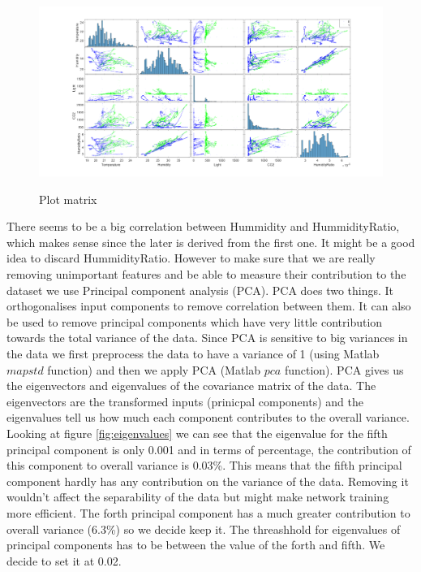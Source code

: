 \documentclass[a4paper, 11pt]{article}
\begin{document}
\begin{figure}[h]
  \caption{Plot matrix}
  \centering
    \includegraphics[width=1\textwidth]{Plotmatrix.png}
    \label{fig:plotmatrix}
\end{figure}

There seems to be a big correlation between Hummidity and HummidityRatio, which makes sense since the later is derived from the first one. It might be a good idea to discard HummidityRatio. However to make sure that we are really removing unimportant features and be able to measure their contribution to the dataset we use Principal component analysis (PCA). PCA does two things. It orthogonalises input components to remove correlation between them. It can also be used to remove principal components which have very little contribution towards the total variance of the data. Since PCA is sensitive to big variances in the data we first preprocess the data to have a variance of 1 (using Matlab $mapstd$ function) and then we apply PCA (Matlab $pca$ function). PCA gives us the eigenvectors and eigenvalues of the covariance matrix of the data. The eigenvectors are the transformed inputs (prinicpal components) and the eigenvalues tell us how much each component contributes to the overall variance. Looking at figure \ref{fig:eigenvalues} we can see that the eigenvalue for the fifth principal component is only 0.001 and in terms of percentage, the contribution of this component to overall variance is 0.03\%. This means that the fifth principal component hardly has any contribution on the variance of the data. Removing it wouldn't affect the separability of the data but might make network training more efficient. The forth principal component has a much greater contribution to overall variance (6.3\%) so we decide keep it. The threashhold for eigenvalues of principal components has to be between the value of the forth and fifth. We decide to set it at 0.02. 
\end{document}
